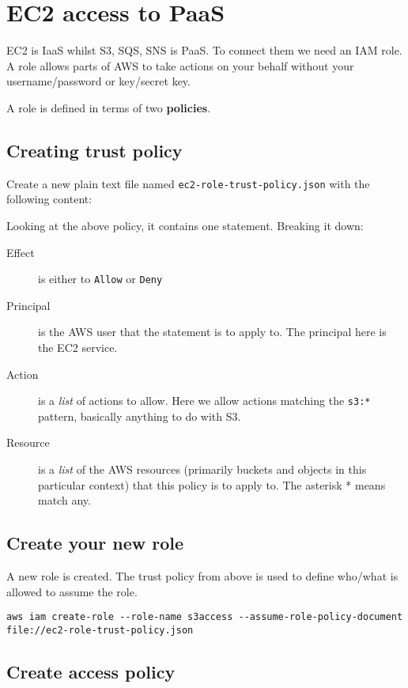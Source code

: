 \chapter{EC2 access to PaaS}\label{ec2-access-to-paas}

EC2 is IaaS whilst S3, SQS, SNS is PaaS. To connect them we need an IAM
role. A role allows parts of AWS to take actions on your behalf without
your username/password or key/secret key.

A role is defined in terms of two \textbf{policies}.

\section{Creating trust policy}\label{creating-trust-policy}

Create a new plain text file named \texttt{ec2-role-trust-policy.json}
with the following content:

Looking at the above policy, it contains one statement. Breaking it
down:

\begin{description}
\item[Effect]
is either to \texttt{Allow} or \texttt{Deny}
\item[Principal]
is the AWS user that the statement is to apply to. The principal here is
the EC2 service.
\item[Action]
is a \emph{list} of actions to allow. Here we allow actions matching the
\texttt{s3:*} pattern, basically anything to do with S3.
\item[Resource]
is a \emph{list} of the AWS resources (primarily buckets and objects in
this particular context) that this policy is to apply to. The asterisk *
means match any.
\end{description}

\section{Create your new role}\label{create-your-new-role}

A new role is created. The trust policy from above is used to define
who/what is allowed to assume the role.

\begin{verbatim}
aws iam create-role --role-name s3access --assume-role-policy-document file://ec2-role-trust-policy.json
\end{verbatim}

\section{Create access policy}\label{create-access-policy}


